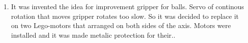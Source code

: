 \begin{enumerate}
\begin{enumerate}
        \item It was invented the idea for improvement gripper for balls. Servo of continous rotation that moves gripper rotates too slow. So it was decided to replace it on two Lego-motors that arranged on both sides of the axis. Motors were installed and it was made metalic protection for their..
        \begin{figure}[H]
	  	  \begin{minipage}[h]{0.47\linewidth}
	  	  \end{minipage}
	  	  \hfill
	  	  \begin{minipage}[h]{0.24\linewidth}

\end{minipage}
\end{figure}
\end{enumerate}
\end{enumerate}
